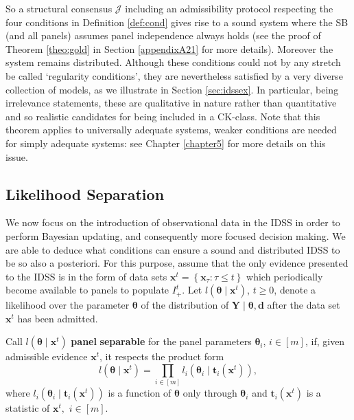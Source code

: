 So a structural consensus $\mathcal{J}$ including an admissibility protocol respecting the four conditions in Definition \ref{def:cond} gives rise to a sound system where the SB (and all panels) assumes panel independence always holds (see the proof of Theorem \ref{theo:gold} in Section \ref{appendixA21} for more details). Moreover the system remains distributed. Although these conditions  could not by any stretch be called \lq{regularity conditions}', they  are  nevertheless satisfied by a very diverse collection of models, as we illustrate in Section \ref{sec:idssex}. In particular, being irrelevance statements, these are qualitative in nature rather than quantitative and so realistic candidates for being included in a CK-class. Note that this theorem applies to universally adequate systems, weaker conditions are needed for simply adequate systems: see Chapter \ref{chapter5} for more details on this issue.

\label{sec:coherence}
\subsection{Likelihood Separation}
We now focus on the introduction of observational data in the IDSS in order to perform Bayesian updating, and consequently more focused decision making. We are able to deduce what conditions can ensure a sound and distributed IDSS to be so also a posteriori. For this purpose, assume that the only evidence presented to the IDSS is in the form of data sets $\bm{x}^{t}=\left\{ \bm{x}_{\tau}:\tau \leq t\right\} $ which periodically become available to panels to populate $I_{+}^{t}$. Let $l(\bm{\theta }\;|\;\bm{x}^{t})$, $t\geq 0$, denote a likelihood over the parameter $\bm{\theta }$ of the distribution of $\bm{Y}\;|\;\bm{\theta},\bm{d}$ after the data set $\bm{x}^t $ has been admitted.

\begin{definition}
Call $l(\bm{\theta }\;|\;\bm{x}^{t})$ \textbf{panel} \textbf{separable} for the panel parameters $\bm{\theta }_{i}$, $i\in[m]$, if, given admissible evidence $\bm{x}^t $,  it respects the product form 
\begin{equation}
l(\bm{\theta }\;|\;\bm{x}^{t})=\prod_{i\in[m]}l_{i}(\bm{\theta }_{i}\;|\;\bm{t}_{i}(\bm{x}^{t})),
\label{liksep}
\end{equation}
where $l_{i}(\bm{\theta }_{i}\;|\;\bm{t}_{i}(\bm{x}^{t}))$ is a function of $\bm{\theta }$ only through $\bm{\theta }_{i}$ and $\bm{t}_{i}(\bm{x}^{t})$ is a statistic of $\bm{x}^{t},$ $i\in[m]$.
\label{def:liksep}
\end{definition}

